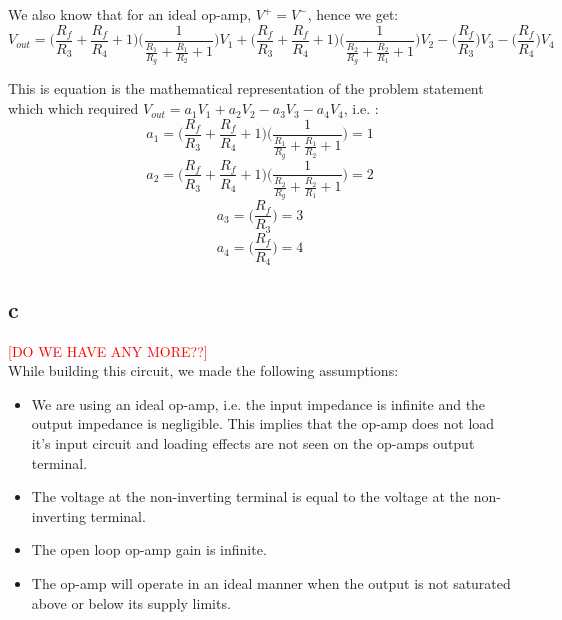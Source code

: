 \documentclass{article}
\newcommand{\xxx}[1]{\textcolor{red}{#1}}
\theoremstyle{plain}
\theoremstyle{definition}
\theoremstyle{remark}
\begin{document}
We also know that for an ideal op-amp, $V^+ = V^-$, hence we get:
$$ V_{out} = \Big( \frac{R_f}{R_3} + \frac{ R_f}{R_4} + 1\Big) \Big( \frac{1}{\frac{R_1}{R_g} + \frac{R_1}{R_2} + 1}\Big) V_1 + \Big( \frac{R_f}{R_3} + \frac{ R_f}{R_4} + 1\Big) \Big( \frac{1}{\frac{R_2}{R_g} + \frac{R_2}{R_1} + 1} \Big) V_2 - \Big( \frac{R_f}{R_3}\Big)V_3 - \Big( \frac{ R_f}{R_4}\Big)V_4$$

This is equation is the mathematical representation of the problem statement which which required $V_{out} = a_1V_1 + a_2 V_2 - a_3 V_3 - a_4 V_4$, i.e. :
$$a_1 =  \Big( \frac{R_f}{R_3} + \frac{ R_f}{R_4} + 1\Big) \Big( \frac{1}{\frac{R_1}{R_g} + \frac{R_1}{R_2} + 1}\Big) = 1$$
$$a_2 =  \Big( \frac{R_f}{R_3} + \frac{ R_f}{R_4} + 1\Big) \Big( \frac{1}{\frac{R_2}{R_g} + \frac{R_2}{R_1} + 1} \Big) = 2$$
$$a_3 = \Big( \frac{R_f}{R_3}\Big) = 3$$
$$a_4 = \Big( \frac{ R_f}{R_4}\Big) = 4$$


\subsection*{c}
\xxx{[DO WE HAVE ANY MORE??]}\\
While building this circuit, we made the following assumptions:
\begin{itemize}
\item We are using an ideal op-amp, i.e. the input impedance is infinite and the output impedance is negligible. This implies that the op-amp does not load it's input circuit and loading effects are not seen on the op-amps output terminal.

\item The voltage at the non-inverting terminal is equal to the voltage at the non-inverting terminal.

\item The open loop op-amp gain is infinite.

\item The op-amp will operate in an ideal manner when the output is not saturated above or below its supply limits.

\end{itemize}
\end{document}
